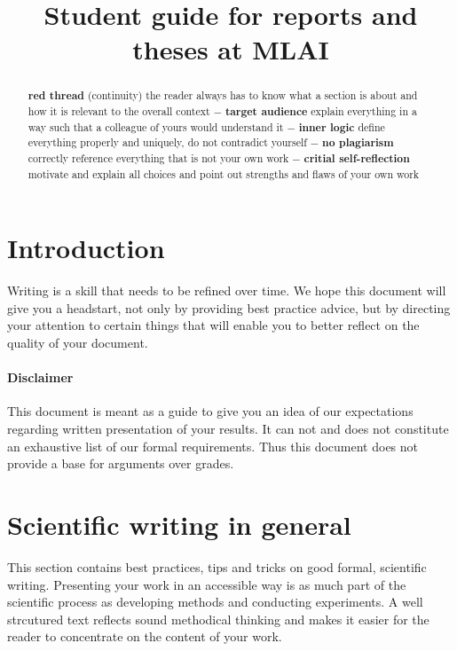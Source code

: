 \documentclass[nodate]{proc}
\date{} %
\begin{document}
\title{\textbf{Student guide for reports and theses at MLAI}}
% 		

\maketitle

\begin{abstract}
	 \textbf{red thread} (continuity) the reader always has to know what a section is about and how it is relevant to the overall context $-$ \textbf{target audience} explain everything in a way such that a colleague of yours would understand it $-$ \textbf{inner logic} define everything properly and uniquely, do not contradict yourself  $-$ \textbf{no plagiarism} correctly reference everything that is not your own work  $-$ \textbf{critial self-reflection} motivate and explain all choices and point out strengths and flaws of your own work
\end{abstract}

\tableofcontents


\section{Introduction}
Writing is a skill that needs to be refined over time. We hope this document will give you a headstart, not only by providing best practice advice, but by directing your attention to certain things that will enable you to better reflect on the quality of your document.

\paragraph{Disclaimer} This document is meant as a guide to give you an idea of our expectations regarding written presentation of your results. It can not and does not constitute an exhaustive list of our formal requirements. Thus this document does not provide a base for arguments over grades.

\section{Scientific writing in general}
This section contains best practices, tips and tricks on good formal, scientific writing. Presenting your work in an accessible way is as much part of the scientific process as developing methods and conducting experiments. A well strcutured text reflects sound methodical thinking and makes it easier for the reader to concentrate on the content of your work. \cite{zobel_writing}
\end{document}
